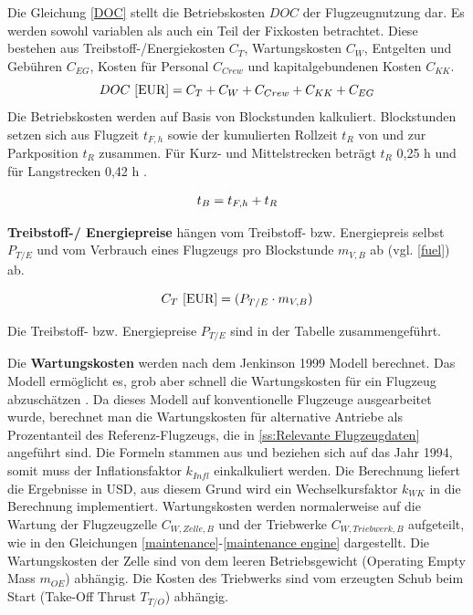 Die Gleichung \eqref{DOC} stellt die Betriebskosten $DOC$ der Flugzeugnutzung dar. 
Es werden sowohl variablen als auch ein Teil der Fixkosten betrachtet.
Diese bestehen aus Treibstoff-/Energiekosten $C_T$, 
Wartungskosten $C_W$, Entgelten und Gebühren $C_{EG}$, 
Kosten für Personal $C_{Crew}$ und kapitalgebundenen Kosten $C_{KK}$.
%
\begin{equation}
     {DOC ~[\text{EUR}]} = C_T + C_W + C_{Crew} + C_{KK} + C_{EG} \\
     \label{DOC}
  \end{equation}
%
Die Betriebskosten werden auf Basis von Blockstunden kalkuliert. 
Blockstunden setzen sich aus Flugzeit $t_{F,h}$ sowie der kumulierten Rollzeit $t_{R}$ 
von und zur Parkposition $t_{R}$ zusammen. 
Für Kurz- und Mittelstrecken beträgt $t_{R}$ {0,25 h} und für Langstrecken 0,42 h \cite{scholz_design_evaluation_doc}.

\begin{equation}
   t_{B} = t_{F,h} + t_{R} \\
   \label{blockzeit}
\end{equation}

\textbf{Treibstoff-/ Energiepreise} hängen vom Treibstoff- bzw. Energiepreis selbst $P_{T/E}$ 
und vom Verbrauch eines Flugzeugs pro Blockstunde $m_{V,B}$ ab (vgl. \eqref{fuel}) ab.

\begin{equation}
   {C_T ~[\text{EUR}]} = (P_{T/E} \cdot m_{V,B}) \\
   \label{fuel}
\end{equation}

Die Treibstoff- bzw. Energiepreise $P_{T/E}$ sind in der Tabelle zusammengeführt.

Die \textbf{Wartungskosten} werden nach dem Jenkinson 1999 Modell berechnet. 
Das Modell ermöglicht es, grob aber schnell die Wartungskosten 
für ein Flugzeug abzuschätzen \cite{bruge2018wartungskosten}.
Da dieses Modell auf konventionelle Flugzeuge ausgearbeitet wurde, 
berechnet man die Wartungskosten für alternative Antriebe als Prozentanteil des Referenz-Flugzeugs, 
die in \ref{ss:Relevante Flugzeugdaten} angeführt sind.
Die Formeln stammen aus \cite{bruge2018wartungskosten} und beziehen sich auf das Jahr 1994, 
somit muss der Inflationsfaktor $k_{Infl}$ einkalkuliert werden. 
Die Berechnung liefert die Ergebnisse in USD, 
aus diesem Grund wird ein Wechselkursfaktor $k_{WK}$ in die Berechnung implementiert.
Wartungskosten werden normalerweise auf die Wartung der Flugzeugzelle $C_{W,Zelle,B}$ 
und der Triebwerke $C_{W,Triebwerk,B}$ aufgeteilt, 
wie in den Gleichungen \eqref{maintenance}-\eqref{maintenance engine} dargestellt. 
Die Wartungskosten der Zelle sind von dem leeren Betriebsgewicht 
(Operating Empty Mass $m_{OE}$) abhängig. 
Die Kosten des Triebwerks sind vom erzeugten Schub beim Start (Take-Off Thrust $T_{T/O}$) abhängig.

